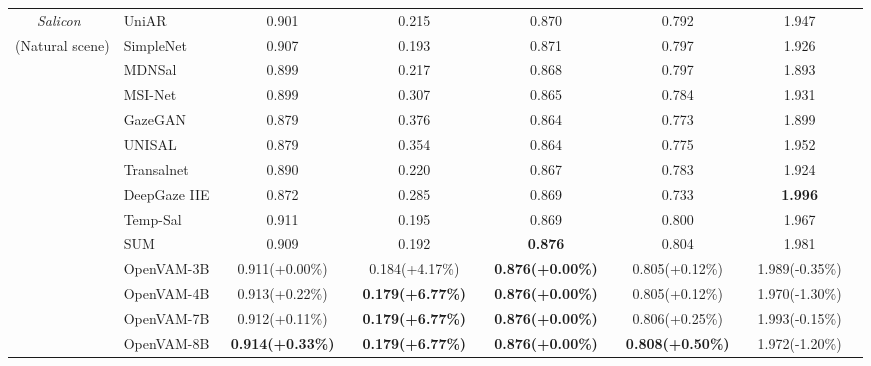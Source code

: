\begin{table}[t]
{\begin{tabular}{c|lcccccccccc}
    \textit{Salicon}~\cite{jiang2015salicon}
    & UniAR~\cite{li2024uniar} & 0.901 && 0.215 && 0.870 && 0.792 && 1.947 & \\
    (Natural scene)
    & SimpleNet~\cite{reddy2020tidying} & 0.907 && 0.193 && 0.871 && 0.797 && 1.926 & \\
    & MDNSal~\cite{reddy2020tidying} & 0.899 && 0.217 && 0.868 && 0.797 && 1.893 & \\
    & MSI-Net~\cite{kroner2020contextual} & 0.899 && 0.307 && 0.865 && 0.784 && 1.931 & \\
    & GazeGAN~\cite{che2019gazegan} & 0.879 && 0.376 && 0.864 && 0.773 && 1.899 & \\
    & UNISAL~\cite{droste2020unified} & 0.879 && 0.354 && 0.864 && 0.775 && 1.952 & \\
    & Transalnet~\cite{lou2022transalnet} & 0.890 && 0.220 && 0.867 && 0.783 && 1.924 & \\
    & DeepGaze IIE~\cite{linardos2021deepgaze} & 0.872 && 0.285 && 0.869 && 0.733 && \textbf{1.996} & \\
    & Temp-Sal~\cite{aydemir2023tempsal} & 0.911 && 0.195 && 0.869 && 0.800 && 1.967 & \\
    & SUM~\cite{hosseini2025sum} & 0.909 && 0.192 && \textbf{0.876} && 0.804 && 1.981 & \\
    \cmidrule{2-12}
    & \cellcolor[HTML]{DADCFF}OpenVAM-3B
    & \cellcolor[HTML]{DADCFF}0.911\scriptsize{(+0.00\%)} && 
      \cellcolor[HTML]{DADCFF}0.184\scriptsize{(+4.17\%)} && 
      \cellcolor[HTML]{DADCFF}\textbf{0.876\scriptsize{(+0.00\%)}} && 
      \cellcolor[HTML]{DADCFF}0.805\scriptsize{(+0.12\%)} && 
      \cellcolor[HTML]{DADCFF}1.989\scriptsize{(-0.35\%)} & \\
    & \cellcolor[HTML]{DADCFF}OpenVAM-4B
    & \cellcolor[HTML]{DADCFF}0.913\scriptsize{(+0.22\%)} && 
      \cellcolor[HTML]{DADCFF}\textbf{0.179\scriptsize{(+6.77\%)}} && 
      \cellcolor[HTML]{DADCFF}\textbf{0.876\scriptsize{(+0.00\%)}} && 
      \cellcolor[HTML]{DADCFF}0.805\scriptsize{(+0.12\%)} && 
      \cellcolor[HTML]{DADCFF}1.970\scriptsize{(-1.30\%)} & \\
    & \cellcolor[HTML]{DADCFF}OpenVAM-7B
    & \cellcolor[HTML]{DADCFF}0.912\scriptsize{(+0.11\%)} && 
      \cellcolor[HTML]{DADCFF}\textbf{0.179\scriptsize{(+6.77\%)}} && 
      \cellcolor[HTML]{DADCFF}\textbf{0.876\scriptsize{(+0.00\%)}} && 
      \cellcolor[HTML]{DADCFF}0.806\scriptsize{(+0.25\%)} && 
      \cellcolor[HTML]{DADCFF}1.993\scriptsize{(-0.15\%)} & \\
    & \cellcolor[HTML]{DADCFF}OpenVAM-8B
    & \cellcolor[HTML]{DADCFF}\textbf{0.914\scriptsize{(+0.33\%)}} && 
      \cellcolor[HTML]{DADCFF}\textbf{0.179\scriptsize{(+6.77\%)}} && 
      \cellcolor[HTML]{DADCFF}\textbf{0.876\scriptsize{(+0.00\%)}} && 
      \cellcolor[HTML]{DADCFF}\textbf{0.808\scriptsize{(+0.50\%)}} && 
      \cellcolor[HTML]{DADCFF}1.972\scriptsize{(-1.20\%)} & \\
    \midrule
    

\end{tabular}}
\end{table}
